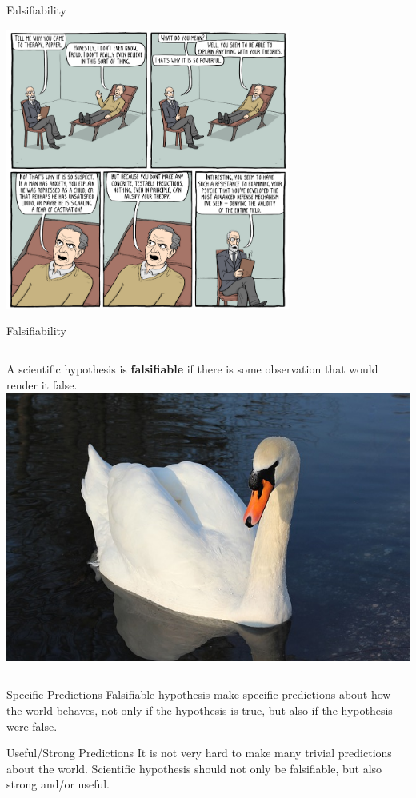 \documentclass{beamer}
\begin{document}
\begin{CJK}{UTF8}{ipxm}
\begin{frame}{Falsifiability}
  \begin{center}
    \includegraphics[width=0.7\textwidth]{../img/existentialcomics_popper}
  \end{center}
\end{frame}

\begin{frame}{Falsifiability}
  \begin{columns}
    A scientific hypothesis is {\bf falsifiable} if there is some observation that would render it false.
    \includegraphics[width=1\textwidth]{../img/pixabay_whiteswan}
  \end{columns}
  \begin{block}{Specific Predictions}
    Falsifiable hypothesis make specific predictions about how the world behaves, not only if the hypothesis is true, but also if the hypothesis were false.
  \end{block}
  \begin{block}{Useful/Strong Predictions}
    It is not very hard to make many trivial predictions about the world. Scientific hypothesis should not only be falsifiable, but also strong and/or useful.
  \end{block}
\end{frame}


\end{CJK}
\end{document}
